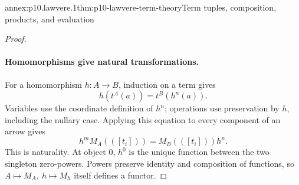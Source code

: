 \begin{annexitem}{annex:p10.lawvere.1}{thm:p10-lawvere-term-theory}{Term tuples, composition, products, and evaluation}
\begin{proof}
\paragraph{Homomorphisms give natural transformations.}
For a homomorphism \(h:A\to B\), induction on a term gives
\[
                            h(t^A(a))=t^B(h^n(a)).
\]
Variables use the coordinate definition of \(h^n\);
operations use preservation by \(h\), including the nullary
case.  Applying this equation to every component of an arrow
gives
\[
                   h^m M_A(([t_i]))=M_B(([t_i]))h^n.
\]
This is naturality.  At object \(0\), \(h^0\) is the unique
function between the two singleton zero-powers.
Powers preserve identity and composition of functions, so
\(A\mapsto M_A,\ h\mapsto M_h\) itself defines a functor.
\end{proof}
\end{annexitem}

